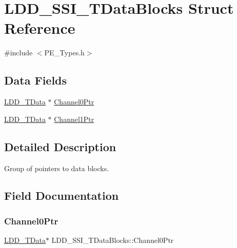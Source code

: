 \hypertarget{struct_l_d_d___s_s_i___t_data_blocks}{}\section{L\+D\+D\+\_\+\+S\+S\+I\+\_\+\+T\+Data\+Blocks Struct Reference}
\label{struct_l_d_d___s_s_i___t_data_blocks}


{\ttfamily \#include $<$P\+E\+\_\+\+Types.\+h$>$}

\subsection*{Data Fields}
\begin{DoxyCompactItemize}
\item 
\hyperlink{group___p_e___types__module_gade8ef9401405bd941b6da738b807f980}{L\+D\+D\+\_\+\+T\+Data} $\ast$ \hyperlink{struct_l_d_d___s_s_i___t_data_blocks_a8b1b9f1fd6075f9d9975f1506ac64a16}{Channel0\+Ptr}
\item 
\hyperlink{group___p_e___types__module_gade8ef9401405bd941b6da738b807f980}{L\+D\+D\+\_\+\+T\+Data} $\ast$ \hyperlink{struct_l_d_d___s_s_i___t_data_blocks_a5c0e65fe82f88a245123217769316fef}{Channel1\+Ptr}
\end{DoxyCompactItemize}


\subsection{Detailed Description}
Group of pointers to data blocks. 

\subsection{Field Documentation}
\mbox{\label{struct_l_d_d___s_s_i___t_data_blocks_a8b1b9f1fd6075f9d9975f1506ac64a16}} 
\subsubsection{\texorpdfstring{Channel0\+Ptr}{Channel0Ptr}}
{\footnotesize\ttfamily \hyperlink{group___p_e___types__module_gade8ef9401405bd941b6da738b807f980}{L\+D\+D\+\_\+\+T\+Data}$\ast$ L\+D\+D\+\_\+\+S\+S\+I\+\_\+\+T\+Data\+Blocks\+::\+Channel0\+Ptr}

